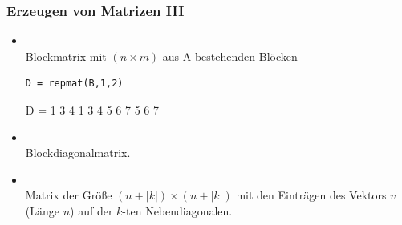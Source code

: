 \documentclass[hyperref={xetex}]{beamer}
\begin{document}
\begin{frame}[fragile]\frametitle{Erzeugen von Matrizen III}
\begin{itemize}
\item {}\\ Blockmatrix mit $(n \times m)$
  aus A bestehenden Blöcken
\begin{lstlisting}
D = repmat(B,1,2)
\end{lstlisting}
\begin{matlab}
D =
     1     3     4     1     3     4
     5     6     7     5     6     7 
\end{matlab}


\item {}\\ Blockdiagonalmatrix.
\item {} \\Matrix der Größe $(n+|k|) \times
  (n+|k|)$ mit den Einträgen des Vektors $v$ (Länge $n$) auf der $k$-ten Nebendiagonalen. 
\end{itemize}
\end{frame}
\end{document}
